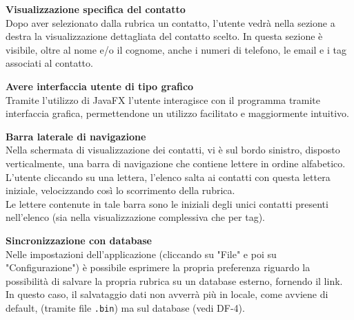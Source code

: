 \newcommand{\UIitem}{\addtocounter{UIcounter}{1}UI-\theUIcounter}
\begin{tcolorbox}[colback=white,colframe=black!80!white,title=\textbf{Interfaccia Utente UI}]
	\begin{itemize}[itemsep=2pt, topsep=0pt, label=\textbf{\UIitem}]
		\item \textbf{Visualizzazione specifica del contatto}
		\\Dopo aver selezionato dalla rubrica un contatto, l’utente vedrà nella sezione a destra la visualizzazione dettagliata del contatto scelto. In questa sezione è visibile, oltre al nome e/o il cognome, anche i numeri di telefono, le email e i tag associati al contatto.
		
		\item \textbf{Avere interfaccia utente di tipo grafico} 
		\\Tramite l’utilizzo di JavaFX l’utente interagisce con il programma tramite interfaccia grafica, permettendone un utilizzo facilitato e maggiormente intuitivo.
		
		\item \textbf{Barra laterale di navigazione}
		\\Nella schermata di visualizzazione dei contatti, vi è sul bordo sinistro, disposto verticalmente, una barra di navigazione che contiene lettere in ordine alfabetico. L’utente cliccando su una lettera, l’elenco salta ai contatti con questa lettera iniziale, velocizzando così lo scorrimento della rubrica.
		\\Le lettere contenute in tale barra sono le iniziali degli unici contatti presenti nell’elenco (sia nella visualizzazione complessiva che per tag).
		
	\end{itemize}
\end{tcolorbox}

\newcommand{\ISitem}{\addtocounter{IScounter}{1}IS-\theIScounter}
\begin{tcolorbox}[colback=white,colframe=black!80!white,title=\textbf{Interfacce con sistemi esterni IS}]
	\begin{itemize}[itemsep=2pt, topsep=0pt, label=\textbf{\ISitem}]
		\item \textbf{Sincronizzazione con database}
		\\Nelle impostazioni dell’applicazione (cliccando su "File" e poi su "Configurazione") è possibile esprimere la propria preferenza riguardo la possibilità di salvare la propria rubrica su un database esterno, fornendo il link. 
		\\In questo caso, il salvataggio dati non avverrà più in locale, come avviene di default, (tramite file \texttt{.bin}) ma sul database (vedi DF-4).
	\end{itemize}
\end{tcolorbox}


